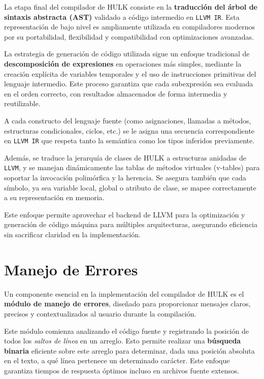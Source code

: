\documentclass{article}
\begin{document}
La etapa final del compilador de HULK consiste en la \textbf{traducción del árbol de sintaxis abstracta (AST)} validado a código intermedio en \texttt{LLVM IR}. Esta representación de bajo nivel es ampliamente utilizada en compiladores modernos por su portabilidad, flexibilidad y compatibilidad con optimizaciones avanzadas.

La estrategia de generación de código utilizada sigue un enfoque tradicional de \textbf{descomposición de expresiones} en operaciones más simples, mediante la creación explícita de variables temporales y el uso de instrucciones primitivas del lenguaje intermedio. Este proceso garantiza que cada subexpresión sea evaluada en el orden correcto, con resultados almacenados de forma intermedia y reutilizable.

A cada constructo del lenguaje fuente (como asignaciones, llamadas a métodos, estructuras condicionales, ciclos, etc.) se le asigna una secuencia correspondiente en \texttt{LLVM IR} que respeta tanto la semántica como los tipos inferidos previamente.

Además, se traduce la jerarquía de clases de HULK a estructuras anidadas de \texttt{LLVM}, y se manejan dinámicamente las tablas de métodos virtuales (v-tables) para soportar la invocación polimórfica y la herencia. Se asegura también que cada símbolo, ya sea variable local, global o atributo de clase, se mapee correctamente a su representación en memoria.

Este enfoque permite aprovechar el backend de LLVM para la optimización y generación de código máquina para múltiples arquitecturas, asegurando eficiencia sin sacrificar claridad en la implementación.

\section{Manejo de Errores}

Un componente esencial en la implementación del compilador de HULK es el \textbf{módulo de manejo de errores}, diseñado para proporcionar mensajes claros, precisos y contextualizados al usuario durante la compilación.

Este módulo comienza analizando el código fuente y registrando la posición de todos los \textit{saltos de línea} en un arreglo. Esto permite realizar una \textbf{búsqueda binaria} eficiente sobre este arreglo para determinar, dada una posición absoluta en el texto, a qué línea pertenece un determinado carácter. Este enfoque garantiza tiempos de respuesta óptimos incluso en archivos fuente extensos.
\end{document}
